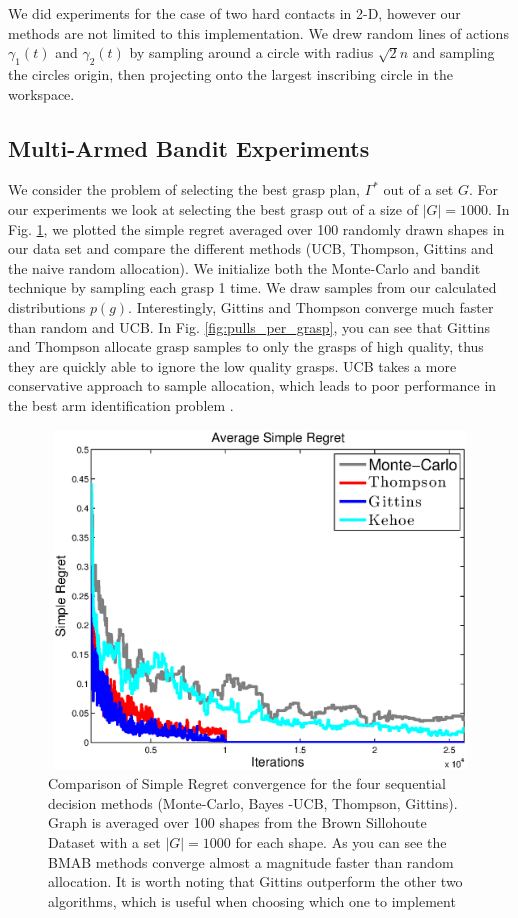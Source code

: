 \documentclass[journal,transmag]{IEEEtran}%
\begin{document}
We did experiments for the case of two hard contacts in 2-D, however our methods are not limited to this implementation. We drew random lines of actions $\gamma_1(t)$ and $\gamma_2(t)$ by sampling around a circle with radius $\sqrt{2}n$ and sampling the circles origin, then projecting onto the largest inscribing circle in the workspace. 

\subsection{Multi-Armed Bandit Experiments}
We consider the problem of selecting the best grasp plan, $\Gamma^*$ out of a set $G$. For our experiments we look at selecting the best grasp out of a size of $|G| = 1000$. In Fig. \ref{fig:simple_regret}, we plotted the simple regret averaged over 100 randomly drawn shapes in our data set and compare the different methods (UCB, Thompson, Gittins and the naive random allocation). We initialize both the Monte-Carlo and bandit technique by sampling each grasp 1 time. We draw samples from our calculated distributions $p(g)$.  Interestingly, Gittins and Thompson converge much faster than random and UCB. In Fig. \ref{fig:pulls_per_grasp}, you can see that Gittins and Thompson allocate grasp samples to only the grasps of high quality, thus they are quickly able to ignore the low quality grasps. UCB takes a more conservative approach to sample allocation, which leads to poor performance in the best arm identification problem \cite{bubeck2009pure}.

\begin{figure}[ht!]
\centering
\includegraphics[width = 16.5cm, height = 9cm]{matlab_figures/simple_regret.eps}
\caption{ \footnotesize Comparison of Simple Regret convergence for the four sequential decision methods (Monte-Carlo, Bayes -UCB, Thompson, Gittins). Graph is averaged over 100 shapes from the Brown Sillohoute Dataset \cite{brown} with a set $|G|=1000$ for each shape. As you can see the BMAB methods converge almost a magnitude faster than random allocation. It is worth noting that Gittins outperform the other two algorithms, which is useful when choosing which one to implement }
\vspace*{-10pt}
\label{fig:simple_regret}
\end{figure}
\end{document}
